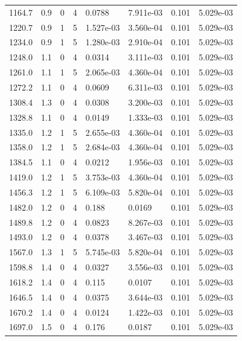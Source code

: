 \documentclass[preview]{standalone}
\begin{document}
{{{\begin{tabular}{L{1.2cm}C{1.2cm} C{0.3cm}C{0.5cm} C{1.4cm}C{1.4cm} C{1.4cm}C{1.4cm}}
  1164.7  &   0.9  & 0     &  4 &  0.0788  & 7.911e-03  & 0.101 &  5.029e-03   \\ 
  1220.7  &   0.9  & 1     &  5 &  1.527e-03  & 3.560e-04  & 0.101 &  5.029e-03   \\ 
  1234.0  &   0.9  & 1     &  5 &  1.280e-03  & 2.910e-04  & 0.101 &  5.029e-03   \\ 
  1248.0  &   1.1  & 0     &  4 &  0.0314  & 3.111e-03  & 0.101 &  5.029e-03   \\ 
  1261.0  &   1.1  & 1     &  5 &  2.065e-03  & 4.360e-04  & 0.101 &  5.029e-03   \\ 
  1272.2  &   1.1  & 0     &  4 &  0.0609  & 6.311e-03  & 0.101 &  5.029e-03   \\ 
  1308.4  &   1.3  & 0     &  4 &  0.0308  & 3.200e-03  & 0.101 &  5.029e-03   \\ 
  1328.8  &   1.1  & 0     &  4 &  0.0149  & 1.333e-03  & 0.101 &  5.029e-03   \\ 
  1335.0  &   1.2  & 1     &  5 &  2.655e-03  & 4.360e-04  & 0.101 &  5.029e-03   \\ 
  1358.0  &   1.2  & 1     &  5 &  2.684e-03  & 4.360e-04  & 0.101 &  5.029e-03   \\ 
  1384.5  &   1.1  & 0     &  4 &  0.0212  & 1.956e-03  & 0.101 &  5.029e-03   \\ 
  1419.0  &   1.2  & 1     &  5 &  3.753e-03  & 4.360e-04  & 0.101 &  5.029e-03   \\ 
  1456.3  &   1.2  & 1     &  5 &  6.109e-03  & 5.820e-04  & 0.101 &  5.029e-03   \\ 
  1482.0  &   1.2  & 0     &  4 &  0.188  & 0.0169  & 0.101 &  5.029e-03   \\ 
  1489.8  &   1.2  & 0     &  4 &  0.0823  & 8.267e-03  & 0.101 &  5.029e-03   \\ 
  1493.0  &   1.2  & 0     &  4 &  0.0378  & 3.467e-03  & 0.101 &  5.029e-03   \\ 
  1567.0  &   1.3  & 1     &  5 &  5.745e-03  & 5.820e-04  & 0.101 &  5.029e-03   \\ 
  1598.8  &   1.4  & 0     &  4 &  0.0327  & 3.556e-03  & 0.101 &  5.029e-03   \\ 
  1618.2  &   1.4  & 0     &  4 &  0.115  & 0.0107  & 0.101 &  5.029e-03   \\ 
  1646.5  &   1.4  & 0     &  4 &  0.0375  & 3.644e-03  & 0.101 &  5.029e-03   \\ 
  1670.2  &   1.4  & 0     &  4 &  0.0124  & 1.422e-03  & 0.101 &  5.029e-03   \\ 
  1697.0  &   1.5  & 0     &  4 &  0.176  & 0.0187  & 0.101 &  5.029e-03   \\ 

\end{tabular}}}}
\end{document}
